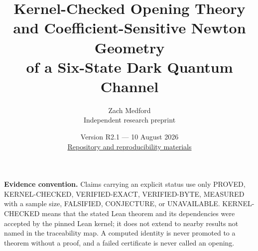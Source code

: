 \documentclass[11pt,a4paper]{article}
\title{Kernel-Checked Opening Theory and Coefficient-Sensitive Newton Geometry\\
of a Six-State Dark Quantum Channel}
\author{Zach Medford\\[-1mm]\small Independent research preprint}
\date{Version R2.1 --- 10 August 2026\\
\small\href{https://github.com/SLresearch74/Signed-Involution-Sector-Exclusion-for-EZT-in-Finite-Magnetic-Graph-Hamiltonians---v1.0.0}{Repository and reproducibility materials}}
\newcommand{\evidence}[1]{\textsf{#1}}
\begin{document}
\maketitle
\begin{abstract}

\end{abstract}
\noindent\textbf{Evidence convention.}
Claims carrying an explicit status use only \evidence{PROVED},
\evidence{KERNEL-CHECKED}, \evidence{VERIFIED-EXACT},
\evidence{VERIFIED-BYTE}, \evidence{MEASURED} with a sample size,
\evidence{FALSIFIED}, \evidence{CONJECTURE}, or \evidence{UNAVAILABLE}.
\evidence{KERNEL-CHECKED} means that the stated Lean theorem and its
dependencies were accepted by the pinned Lean kernel; it does not extend to
nearby results not named in the traceability map.  A computed identity is never
promoted to a theorem without a proof, and a failed certificate is never called
an opening.

\tableofcontents

















\appendix







\printbibliography
\end{document}
